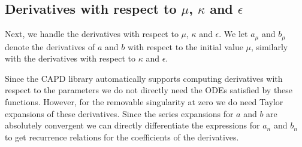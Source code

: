 \documentclass[11pt]{article}
\begin{document}
\subsection{Derivatives with respect to \(\mu\), \(\kappa\) and \(\epsilon\)}
Next, we handle the derivatives with respect to \(\mu\), \(\kappa\)
and \(\epsilon\). We let \(a_{\mu}\) and \(b_{\mu}\) denote the
derivatives of \(a\) and \(b\) with respect to the initial value
\(\mu\), similarly with the derivatives with respect to \(\kappa\) and
\(\epsilon\).

Since the CAPD library automatically supports computing derivatives
with respect to the parameters we do not directly need the ODEs
satisfied by these functions. However, for the removable singularity
at zero we do need Taylor expansions of these derivatives. Since the
series expansions for \(a\) and \(b\) are absolutely convergent we can
directly differentiate the expressions for \(a_{n}\) and \(b_{n}\) to
get recurrence relations for the coefficients of the derivatives.
\end{document}
